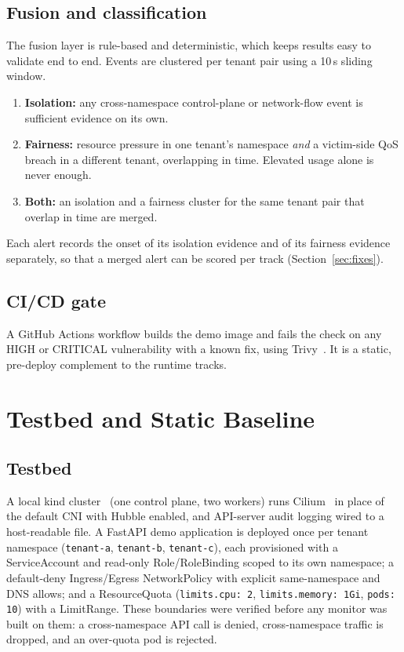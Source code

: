 \documentclass[conference]{IEEEtran}
\newcommand{\code}[1]{\texttt{\small #1}}
\begin{document}
\subsection{Fusion and classification}
The fusion layer is rule-based and deterministic, which keeps results easy to validate end to end. Events are clustered per tenant pair using a 10\,s sliding window.
\begin{enumerate}
\item \textbf{Isolation:} any cross-namespace control-plane or network-flow event is sufficient evidence on its own.
\item \textbf{Fairness:} resource pressure in one tenant's namespace \emph{and} a victim-side QoS breach in a different tenant, overlapping in time. Elevated usage alone is never enough.
\item \textbf{Both:} an isolation and a fairness cluster for the same tenant pair that overlap in time are merged.
\end{enumerate}
Each alert records the onset of its isolation evidence and of its fairness evidence separately, so that a merged alert can be scored per track (Section~\ref{sec:fixes}).

\subsection{CI/CD gate}
A GitHub Actions workflow builds the demo image and fails the check on any HIGH or CRITICAL vulnerability with a known fix, using Trivy~\cite{trivy}. It is a static, pre-deploy complement to the runtime tracks.

\section{Testbed and Static Baseline}
\subsection{Testbed}
A local kind cluster~\cite{k8s} (one control plane, two workers) runs Cilium~\cite{cilium} in place of the default CNI with Hubble enabled, and API-server audit logging wired to a host-readable file. A FastAPI demo application is deployed once per tenant namespace (\code{tenant-a}, \code{tenant-b}, \code{tenant-c}), each provisioned with a ServiceAccount and read-only Role/RoleBinding scoped to its own namespace; a default-deny Ingress/Egress NetworkPolicy with explicit same-namespace and DNS allows; and a ResourceQuota (\code{limits.cpu: 2}, \code{limits.memory: 1Gi}, \code{pods: 10}) with a LimitRange. These boundaries were verified before any monitor was built on them: a cross-namespace API call is denied, cross-namespace traffic is dropped, and an over-quota pod is rejected.
\end{document}
